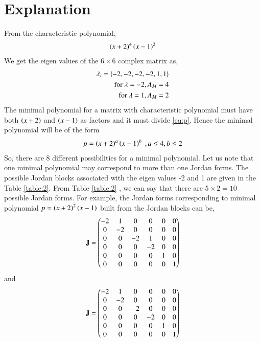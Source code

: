\documentclass[journal,12pt,twocolumn]{IEEEtran}
\numberwithin{table}{section}
\begin{document}
\section{Explanation}
From the characteristic polynomial,
\begin{align}
\left(x+2\right)^4\left(x-1\right)^2\label{eq:p}
\end{align}
We get the eigen values of the $6\times6$ complex matrix as,
\begin{align}
\lambda_i=\left\{-2,-2,-2,-2,1,1\right\}\label{eq:eig}\\
\text{for } \lambda=-2, A_M=4\\
\text{for } \lambda=1, A_M=2
\end{align}
The minimal polynomial for a matrix with characteristic polynomial must have both $\left(x+2\right)$ and $\left(x-1\right)$ as factors and it must divide \eqref{eq:p}. Hence the minimal polynomial will be of the form 
\begin{align}
p=\left(x+2\right)^a\left(x-1\right)^b \; ,a\le 4,b\le2
\end{align}
So, there are 8 different possibilities for a minimal polynomial. Let us note that one minimal polynomial may correspond to more than one Jordan forms. The possible Jordan blocks associated with the eigen values -2 and 1 are given in the Table \ref{table:2}. From Table \ref{table:2} , we can say that there are $5\times2=10$ possible Jordan forms.
For example, the Jordan forms corresponding to minimal polynomial $p=\left(x+2\right)^2\left(x-1\right)$ built from the Jordan blocks can be,
\begin{align}
\mathbf{J}=\begin{pmatrix}-2&1&0&0&0&0\\0&-2&0&0&0&0\\0&0&-2&1&0&0\\0&0&0&-2&0&0\\0&0&0&0&1&0\\0&0&0&0&0&1\end{pmatrix}
\end{align}
and
\begin{align}
\mathbf{J}=\begin{pmatrix}-2&1&0&0&0&0\\0&-2&0&0&0&0\\0&0&-2&0&0&0\\0&0&0&-2&0&0\\0&0&0&0&1&0\\0&0&0&0&0&1\end{pmatrix}
\end{align}
\end{document}
